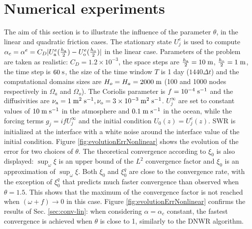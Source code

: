 \section{Numerical experiments}
\label{sec:num-exp}
The aim of this section is to illustrate the influence of the parameter $\theta$, in the linear and quadratic friction cases. 
The stationary state $U_j^e$ is used to compute $\alpha_c = \alpha^e = C_D|U_{\rm a}^e(\frac{h_{\rm a}}{2}) - U_{\rm o}^e (\frac{h_{\rm o}}{2})|$ in the linear case.
Parameters of the problem are taken as realistic: $C_D = 1.2\times 10^{-3}$, the space steps are $\frac{h_{\rm a}}{2} = 10\; {\rm m}$, $\frac{h_{\rm o}}{2} = 1 \;{\rm m}$,
the time step  is $60 \;{\rm s}$,
the size of the time window $T$ is 1 day ($1440\Delta t$) and the computational domains sizes are $H_o = H_a = 2000 \; {\rm m}$
(100 and 1000 nodes respectively in $\Omega_a$ and $\Omega_o$).
The Coriolis parameter is 
$f=10^{-4}\; {\rm s^{-1}}$ and the diffusivities are 
$\nu_{\rm a} = 1\; {\rm m^2}\;{\rm s}^{-1}, 
\nu_{\rm o} = 3\times 10^{-3} \;{\rm m^2}\;{\rm s}^{-1}$. 
 $U_j^\infty$
are  set to constant values of $10\;{\rm m}\;{\rm s}^{-1}$ in the 
atmosphere and $0.1\;{\rm m}\;{\rm s}^{-1}$ in the ocean, while the forcing terms 
$g_j=i f U^\infty_j$ and the initial condition $U_0(z)=U_j^e(z)$.
SWR is 
initialized at the interface with a white noise around the interface value
of the initial condition.
Figure \ref{fig:evolutionErrNonlinear} shows the evolution of the error for two choices of $\theta$. The theoretical
convergence according to $\xi_0$ is
also displayed: $\sup_\omega \xi$ is an upper bound of the $L^2$ convergence factor \cite{thery_etude_2021} and $\xi_0$ is an approximation of $\sup_\omega \xi$.
Both $\xi_0$ and $\xi_0^q$ are close to the convergence rate, with the exception of
$\xi_0^q$ that predicts much faster convergence than observed when $\theta=1.5$. This shows that the maximum of the convergence factor is not reached when $(\omega+f) \rightarrow 0$ in this case. Figure \ref{fig:evolutionErrNonlinear} confirms the results of Sec. \ref{sec:conv-lin}:
when considering $\alpha=\alpha_c$ constant, the fastest convergence is achieved when $\theta$ is close to 1, similarly to the DNWR algorithm.
